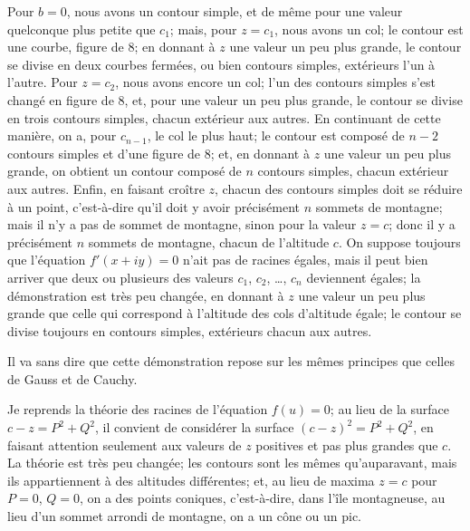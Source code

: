 \documentclass[11pt,a4paper]{book}
\begin{document}
Pour $b = 0$, nous avons un contour simple, et de m\^eme pour une valeur quelconque plus petite que $c_1$; mais, pour $z = c_1$, nous avons un col; le contour est une courbe, figure de 8; en donnant \`a $z$ une valeur un peu plus grande, le contour se divise en deux courbes ferm\'ees, ou bien contours simples, ext\'erieurs l'un \`a l'autre. Pour $z = c_2$, nous avons encore un col; l'un des contours simples s'est chang\'e en figure de 8, et, pour une valeur un peu plus grande, le contour se divise en trois contours simples, chacun ext\'erieur aux autres. En continuant de cette mani\`ere, on a, pour $c_{n-1}$, le col le plus haut; le contour est compos\'e de $n - 2$ contours simples et d'une figure de 8; et, en donnant \`a $z$ une valeur un peu plus grande, on obtient un contour compos\'e de $n$ contours simples, chacun ext\'erieur aux autres. Enfin, en faisant cro\^itre $z$, chacun des contours simples doit se r\'eduire \`a un point, c'est-\`a-dire qu'il doit y avoir pr\'ecis\'ement $n$ sommets de montagne; mais il n'y a pas de sommet de montagne, sinon pour la valeur $z = c$; donc il y a pr\'ecis\'ement $n$ sommets de montagne, chacun de l'altitude $c$. On suppose toujours que l'\'equation $f'(x + iy) = 0$ n'ait pas de racines \'egales, mais il peut bien arriver que deux ou plusieurs des valeurs $c_1$, $c_2$, \ldots, $c_n$ deviennent \'egales; la d\'emonstration est tr\`es peu chang\'ee, en donnant \`a $z$ une valeur un peu plus grande que celle qui correspond \`a l'altitude des cols d'altitude \'egale; le contour se divise toujours en contours simples, ext\'erieurs chacun aux autres.

Il va sans dire que cette d\'emonstration repose sur les m\^emes principes que celles de Gauss et de Cauchy.

Je reprends la th\'eorie des racines de l'\'equation $f(u) = 0$; au lieu de la surface $c - z = P^2 + Q^2$, il convient de consid\'erer la surface $(c - z)^2 = P^2 + Q^2$, en faisant attention seulement aux valeurs de $z$ positives et pas plus grandes que $c$. La th\'eorie est tr\`es peu chang\'ee; les contours sont les m\^emes qu'auparavant, mais ils appartiennent \`a des altitudes diff\'erentes; et, au lieu de maxima $z = c$ pour $P = 0$, $Q = 0$, on a des points coniques, c'est-\`a-dire, dans l'\^ile montagneuse, au lieu d'un sommet arrondi de montagne, on a un c\^one ou un pic.
\end{document}
